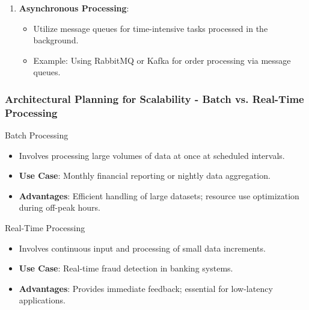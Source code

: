 \documentclass[aspectratio=169]{beamer}
\begin{document}
\begin{frame}[fragile]
\begin{enumerate}
        \item \textbf{Asynchronous Processing}:
        \begin{itemize}
            \item Utilize message queues for time-intensive tasks processed in the background.
            \item Example: Using RabbitMQ or Kafka for order processing via message queues.
        \end{itemize}
    \end{enumerate}
\end{frame}

\begin{frame}[fragile]
    \frametitle{Architectural Planning for Scalability - Batch vs. Real-Time Processing}
    \begin{block}{Batch Processing}
        \begin{itemize}
            \item Involves processing large volumes of data at once at scheduled intervals.
            \item \textbf{Use Case}: Monthly financial reporting or nightly data aggregation.
            \item \textbf{Advantages}: Efficient handling of large datasets; resource use optimization during off-peak hours.
        \end{itemize}
    \end{block}
    
    \begin{block}{Real-Time Processing}
        \begin{itemize}
            \item Involves continuous input and processing of small data increments.
            \item \textbf{Use Case}: Real-time fraud detection in banking systems.
            \item \textbf{Advantages}: Provides immediate feedback; essential for low-latency applications.
        \end{itemize}
    \end{block}
\end{frame}
\end{document}
